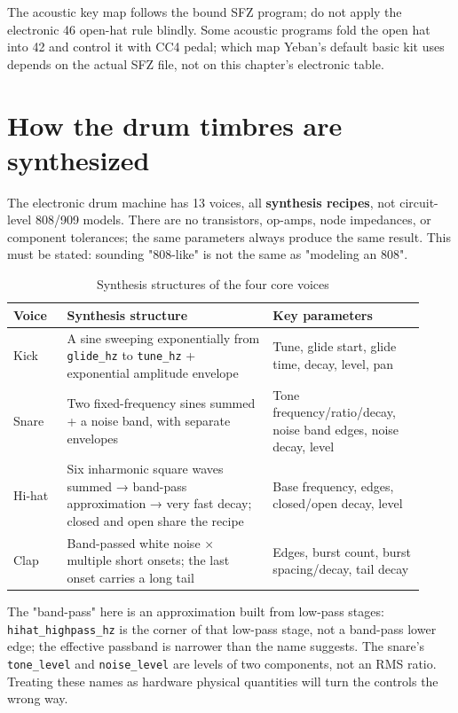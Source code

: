 The acoustic key map follows the bound SFZ program; do not apply the electronic 46 open-hat rule blindly. Some acoustic programs fold the open hat into 42 and control it with CC4 pedal; which map Yeban's default basic kit uses depends on the actual SFZ file, not on this chapter's electronic table.

\section{How the drum timbres are synthesized}

The electronic drum machine has 13 voices, all \textbf{synthesis recipes}, not circuit-level 808/909 models. There are no transistors, op-amps, node impedances, or component tolerances; the same parameters always produce the same result. This must be stated: sounding "808-like" is not the same as "modeling an 808".

\begin{table}[htbp]
\centering
\small
\begin{tabular}{@{}p{0.12\linewidth}p{0.46\linewidth}p{0.34\linewidth}@{}}
\hline
Voice & Synthesis structure & Key parameters \\
\hline
Kick & A sine sweeping exponentially from \texttt{glide\_hz} to \texttt{tune\_hz} + exponential amplitude envelope & Tune, glide start, glide time, decay, level, pan \\
Snare & Two fixed-frequency sines summed + a noise band, with separate envelopes & Tone frequency/ratio/decay, noise band edges, noise decay, level \\
Hi-hat & Six inharmonic square waves summed → band-pass approximation → very fast decay; closed and open share the recipe & Base frequency, edges, closed/open decay, level \\
Clap & Band-passed white noise × multiple short onsets; the last onset carries a long tail & Edges, burst count, burst spacing/decay, tail decay \\
\hline
\end{tabular}
\caption{Synthesis structures of the four core voices}
\label{tab:drum-core-voices}
\end{table}

The "band-pass" here is an approximation built from low-pass stages: \texttt{hihat\_highpass\_hz} is the corner of that low-pass stage, not a band-pass lower edge; the effective passband is narrower than the name suggests. The snare's \texttt{tone\_level} and \texttt{noise\_level} are levels of two components, not an RMS ratio. Treating these names as hardware physical quantities will turn the controls the wrong way.

